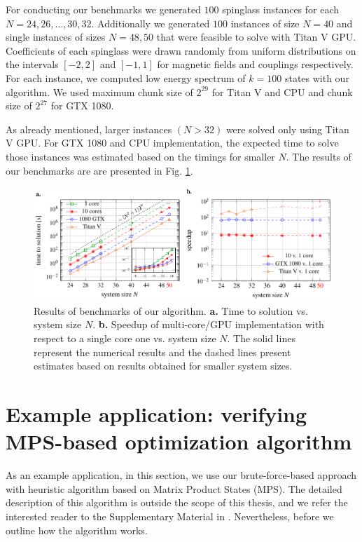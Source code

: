 For conducting our benchmarks we generated $100$ spinglass instances for each
$N=24, 26, \ldots, 30, 32$. Additionally we generated $100$ instances of size
$N=40$ and single instances of sizes $N=48, 50$ that were feasible to solve
with Titan V GPU. Coefficients of each spinglass were drawn randomly from
uniform distributions on the intervals $[-2, 2]$ and $[-1, 1]$ for magnetic
fields and couplings respectively. For each instance, we computed low energy
spectrum of $k=100$ states with our algorithm. We used maximum chunk size of
$2^{29}$ for Titan V and CPU and chunk size of $2^{27}$ for GTX 1080.

As already mentioned, larger instances $(N > 32)$ were solved only using Titan
V GPU. For GTX 1080 and CPU implementation, the expected time to solve those
instances was estimated based on the timings for smaller $N$. The results of
our benchmarks are are presented in Fig. \ref{fig:benchmark_results}.

\begin{figure}
  \centering
  \includegraphics[width=\textwidth]{figures/resultsplot_reduced.pdf}
  \caption{Results of benchmarks of our algorithm. {\textbf{a.}} Time to solution vs.
    system size $N$. {\textbf{b.}} Speedup of multi-core/GPU implementation with
    respect to a single core one vs. system size $N$. The solid lines represent the
    numerical results and the dashed lines present estimates based on results
    obtained for smaller system sizes.} \label{fig:benchmark_results}
\end{figure}

\section{Example application: verifying MPS-based optimization algorithm}

As an example application, in this section, we use our brute-force-based approach with
heuristic algorithm based on Matrix Product States (MPS). The detailed description of this
algorithm is outside the scope of this thesis, and we refer the interested reader to the
Supplementary Material in \cite{tn}. Nevertheless, before we outline how the algorithm works.

